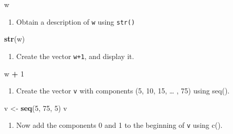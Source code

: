 \documentclass[
]{book}
\newenvironment{Shaded}{\begin{snugshade}}{\end{snugshade}}
\newcommand{\DecValTok}[1]{\textcolor[rgb]{0.00,0.00,0.81}{#1}}
\newcommand{\FunctionTok}[1]{\textcolor[rgb]{0.13,0.29,0.53}{\textbf{#1}}}
\newcommand{\NormalTok}[1]{#1}
\newcommand{\OtherTok}[1]{\textcolor[rgb]{0.56,0.35,0.01}{#1}}
\newcommand{\SpecialCharTok}[1]{\textcolor[rgb]{0.81,0.36,0.00}{\textbf{#1}}}
\providecommand{\tightlist}{%
  \setlength{\itemsep}{0pt}\setlength{\parskip}{0pt}}
\begin{document}
\begin{Shaded}
\begin{Highlighting}[]
\NormalTok{w}
\end{Highlighting}
\end{Shaded}

\begin{enumerate}
\def\labelenumi{\arabic{enumi}.}
\setcounter{enumi}{2}
\tightlist
\item
  Obtain a description of \texttt{w} using \texttt{str()}
\end{enumerate}

\begin{Shaded}
\begin{Highlighting}[]
\FunctionTok{str}\NormalTok{(w)}
\end{Highlighting}
\end{Shaded}

\begin{enumerate}
\def\labelenumi{\arabic{enumi}.}
\setcounter{enumi}{3}
\tightlist
\item
  Create the vector \texttt{w+1}, and display it.
\end{enumerate}

\begin{Shaded}
\begin{Highlighting}[]
\NormalTok{w }\SpecialCharTok{+} \DecValTok{1}
\end{Highlighting}
\end{Shaded}

\begin{enumerate}
\def\labelenumi{\arabic{enumi}.}
\setcounter{enumi}{4}
\tightlist
\item
  Create the vector \texttt{v} with components (5, 10, 15, \ldots{} , 75) using seq().
\end{enumerate}

\begin{Shaded}
\begin{Highlighting}[]
\NormalTok{v }\OtherTok{\textless{}{-}} \FunctionTok{seq}\NormalTok{(}\DecValTok{5}\NormalTok{, }\DecValTok{75}\NormalTok{, }\DecValTok{5}\NormalTok{)}
\NormalTok{v}
\end{Highlighting}
\end{Shaded}

\begin{enumerate}
\def\labelenumi{\arabic{enumi}.}
\setcounter{enumi}{5}
\tightlist
\item
  Now add the components 0 and 1 to the beginning of \texttt{v} using c().
\end{enumerate}
\end{document}
